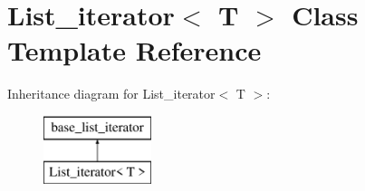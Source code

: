 \hypertarget{classList__iterator}{}\section{List\+\_\+iterator$<$ T $>$ Class Template Reference}
\label{classList__iterator}
Inheritance diagram for List\+\_\+iterator$<$ T $>$\+:\begin{figure}[H]
\begin{center}
\leavevmode
\includegraphics[height=2.000000cm]{classList__iterator}
\end{center}
\end{figure}
